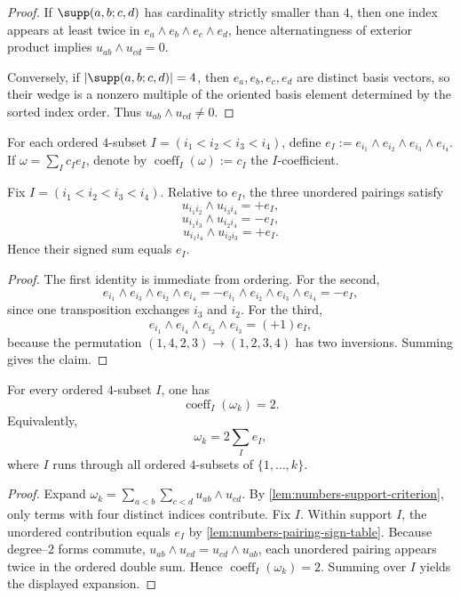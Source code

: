 \begin{proof}
If \(\supp(a,b;c,d)\) has cardinality strictly smaller than \(4\), then one
index appears at least twice in
\(e_a\wedge e_b\wedge e_c\wedge e_d\), hence alternatingness of exterior
product implies
\(u_{ab}\wedge u_{cd}=0\).

Conversely, if \(|\supp(a,b;c,d)|=4\), then
\(e_a,e_b,e_c,e_d\) are distinct basis vectors, so their wedge is a nonzero
multiple of the oriented basis element determined by the sorted index order.
Thus \(u_{ab}\wedge u_{cd}\neq0\).
\end{proof}

\begin{definition}
\label{def:numbers-coefficient-extraction}
For each ordered \(4\)-subset
\(I=(i_1<i_2<i_3<i_4)\), define
\(e_I:=e_{i_1}\wedge e_{i_2}\wedge e_{i_3}\wedge e_{i_4}\).
If
\(\omega=\sum_I c_I e_I\), denote by
\(\operatorname{coeff}_I(\omega):=c_I\) the \(I\)-coefficient.
\end{definition}

\begin{lemma}
\label{lem:numbers-pairing-sign-table}
Fix \(I=(i_1<i_2<i_3<i_4)\).
Relative to \(e_I\), the three unordered pairings satisfy
\[
  u_{i_1i_2}\wedge u_{i_3i_4}=+e_I,
\]
\[
  u_{i_1i_3}\wedge u_{i_2i_4}=-e_I,
\]
\[
  u_{i_1i_4}\wedge u_{i_2i_3}=+e_I.
\]
Hence their signed sum equals \(e_I\).
\end{lemma}

\begin{proof}
The first identity is immediate from ordering.
For the second,
\[
  e_{i_1}\wedge e_{i_3}\wedge e_{i_2}\wedge e_{i_4}
  =-e_{i_1}\wedge e_{i_2}\wedge e_{i_3}\wedge e_{i_4}
  =-e_I,
\]
since one transposition exchanges \(i_3\) and \(i_2\).
For the third,
\[
  e_{i_1}\wedge e_{i_4}\wedge e_{i_2}\wedge e_{i_3}
  =(+1)e_I,
\]
because the permutation
\((1,4,2,3)\to(1,2,3,4)\) has two inversions.
Summing gives the claim.
\end{proof}

\begin{proposition}
\label{prop:numbers-uniform-coefficient}
For every ordered \(4\)-subset \(I\), one has
\[
  \operatorname{coeff}_I(\omega_k)=2.
\]
Equivalently,
\[
  \omega_k=2\sum_I e_I,
\]
where \(I\) runs through all ordered \(4\)-subsets of
\(\{1,\dots,k\}\).
\end{proposition}

\begin{proof}
Expand
\(
  \omega_k=\sum_{a<b}\sum_{c<d}u_{ab}\wedge u_{cd}
\).
By \cref{lem:numbers-support-criterion}, only terms with four distinct
indices contribute.
Fix \(I\).
Within support \(I\), the unordered contribution equals \(e_I\) by
\cref{lem:numbers-pairing-sign-table}.
Because degree--\(2\) forms commute,
\(
  u_{ab}\wedge u_{cd}=u_{cd}\wedge u_{ab}
\),
each unordered pairing appears twice in the ordered double sum.
Hence \(\operatorname{coeff}_I(\omega_k)=2\).
Summing over \(I\) yields the displayed expansion.
\end{proof}

